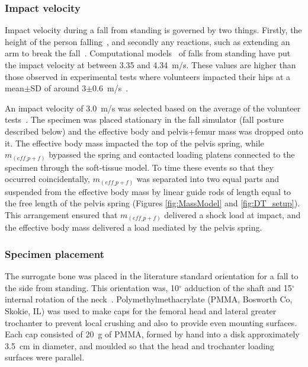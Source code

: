 		\subsubsection{Impact velocity}
		\label{sec:fall_sim_design_methods_apparatus_velocity}
		Impact velocity during a fall from standing is governed by two things.
		Firstly, the height of the person falling~\citep{van_den_kroonenberg_dynamic_1995}, and secondly any reactions, such as extending an arm to break the fall~\citep{feldman_reducing_2007}.
		Computational models~\citep{van_den_kroonenberg_dynamic_1995} of falls from standing have put the impact velocity at between 3.35 and 4.34~\ac{m}/\ac{s}.
		These values are higher than those observed in experimental tests where volunteers impacted their hips at a mean$\pm$SD of around 3$\pm$0.6~\ac{m}/\ac{s}~\citep{feldman_reducing_2007, van_den_kroonenberg_hip_1996}.
		
		An impact velocity of 3.0~\ac{m}/\ac{s} was selected based on the average of the volunteer tests~\citep{feldman_reducing_2007}.
		The specimen was placed stationary in the fall simulator (fall posture described below) and the effective body and pelvis+femur mass was dropped onto it.
		The effective body mass impacted the top of the pelvis spring, while $m_{(eff\_p+f)}$ bypassed the spring and contacted loading platens connected to the specimen through the soft-tissue model.
		To time these events so that they occurred coincidentally, $m_{(eff\_p+f)}$ was separated into two equal parts and suspended from the effective body mass by linear guide rods of length equal to the free length of the pelvis spring (Figures \ref{fig:MassModel} and \ref{fig:DT_setup}).
		This arrangement ensured that $m_{(eff\_p+f)}$ delivered a shock load at impact, and the effective body mass delivered a load mediated by the pelvis spring.

		\subsubsection{Specimen placement}
		\label{sec:fall_sim_design_methods_apparatus_placement}
		The surrogate bone was placed in the literature standard orientation for a fall to the side from standing.
		This orientation was, 10$^\circ$ adduction of the shaft and 15$^\circ$ internal rotation of the neck~\citep{courtney_effects_1994, de_bakker_during_2009, manske_cortical_2008, lochmuller_mechanical_2002}.
		Polymethylmethacrylate (PMMA, Bosworth Co, Skokie, IL) was used to make caps for the femoral head and lateral greater trochanter to prevent local crushing and also to provide even mounting surfaces.
		Each cap consisted of 20~\ac{g} of PMMA, formed by hand into a disk approximately 3.5~\ac{cm} in diameter, and moulded so that the head and trochanter loading surfaces were parallel.
	
